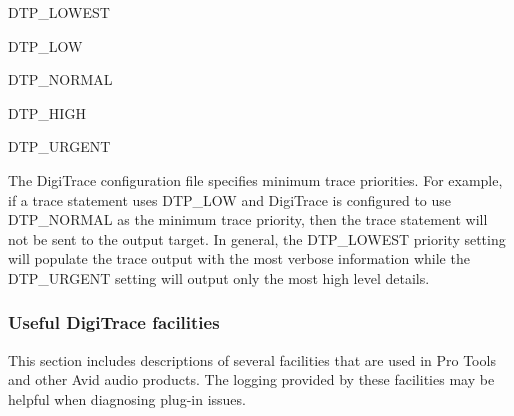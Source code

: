  
\begin{DoxyItemize}
\item {\ttfamily D\+T\+P\+\_\+\+L\+O\+W\+E\+ST } 
\item {\ttfamily D\+T\+P\+\_\+\+L\+OW } 
\item {\ttfamily D\+T\+P\+\_\+\+N\+O\+R\+M\+AL } 
\item {\ttfamily D\+T\+P\+\_\+\+H\+I\+GH } 
\item {\ttfamily D\+T\+P\+\_\+\+U\+R\+G\+E\+NT } 
\end{DoxyItemize}

 The Digi\+Trace configuration file specifies minimum trace priorities. For example, if a trace statement uses {\ttfamily D\+T\+P\+\_\+\+L\+OW} and Digi\+Trace is configured to use {\ttfamily D\+T\+P\+\_\+\+N\+O\+R\+M\+AL} as the minimum trace priority, then the trace statement will not be sent to the output target. In general, the {\ttfamily D\+T\+P\+\_\+\+L\+O\+W\+E\+ST} priority setting will populate the trace output with the most verbose information while the {\ttfamily D\+T\+P\+\_\+\+U\+R\+G\+E\+NT} setting will output only the most high level details.

\hypertarget{a00834_digitrace__configuring__facilities}{}\subsubsection{Useful Digi\+Trace facilities}\label{a00834_digitrace__configuring__facilities}
 This section includes descriptions of several facilities that are used in Pro Tools and other Avid audio products. The logging provided by these facilities may be helpful when diagnosing plug-\/in issues.

